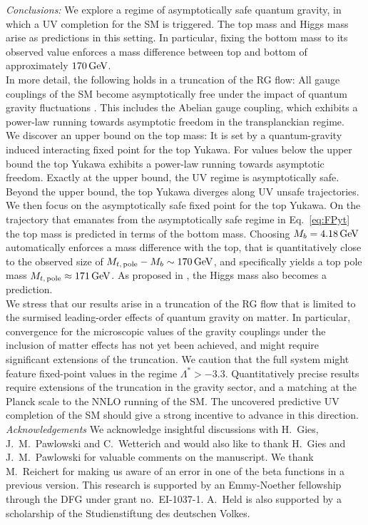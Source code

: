 \documentclass[%
 reprint,
 superscriptaddress,
preprintnumbers,
nofootinbib,
 amsmath,amssymb,
 aps,
prl,
]{revtex4-1}
\begin{document}
\noindent\emph {Conclusions:}
We explore a regime of asymptotically safe quantum gravity, in which a UV completion for the SM is triggered. The top mass and Higgs mass arise as predictions in this setting. In particular, fixing the bottom mass to its observed value enforces a mass difference between top and bottom of approximately $ 170\, \rm GeV$.
\\
In more detail, the following holds in a truncation of the RG flow:
All gauge couplings of the SM become asymptotically free under the impact of quantum gravity fluctuations \cite{Daum:2009dn,Folkerts:2011jz,Harst:2011zx,Christiansen:2017gtg}. This includes the Abelian gauge coupling, which 
exhibits a power-law running towards asymptotic freedom in the transplanckian regime.
\\
We discover an upper bound on the top mass: It is set by a quantum-gravity induced interacting fixed point for the top Yukawa. For values below the upper bound the top Yukawa exhibits a power-law running towards asymptotic freedom. Exactly at the upper bound, the UV regime is asymptotically safe. Beyond the upper bound, the top Yukawa diverges along UV unsafe trajectories.
\\
We then focus on the asymptotically safe fixed point for the top Yukawa. On the trajectory that emanates from the asymptotically safe regime in Eq.~\eqref{eq:FPyt} the top mass is predicted in terms of the bottom mass. Choosing $M_b=4.18\, \rm GeV$ automatically enforces a mass difference with the top, that is quantitatively close to the observed size of $M_{t,\, \rm pole}-M_b\sim 170\, \rm GeV$, and specifically yields a top pole mass $M_{t,\, \rm pole} \approx 171\, \rm GeV$. As proposed in \cite{Shaposhnikov:2009pv,Bezrukov:2012sa}, the Higgs mass also becomes a prediction.\\
We stress that our results arise in a truncation of the RG flow that is limited to  the surmised leading-order effects of quantum gravity on matter. 
In particular, convergence for the microscopic values of the gravity couplings under the inclusion of matter effects has not yet been achieved, and might require significant extensions of the truncation. We caution that the full system might feature fixed-point values in the regime $\Lambda^{\ast}>-3.3$.
Quantitatively precise results require extensions of the truncation in the gravity sector, and a matching at the Planck scale to the NNLO running of the SM. 
The uncovered predictive UV completion of the SM should give a strong incentive to advance in this direction.
\\
\noindent\emph{Acknowledgements}
We acknowledge insightful discussions with H.~Gies, J.~M.~Pawlowski and C.~Wetterich and would also like to thank H.~Gies and J.~M.~Pawlowski for valuable comments on the manuscript. We thank M.~Reichert for making us aware of an error in one of the beta functions in a previous version.
This research is supported by an Emmy-Noether fellowship through the DFG under grant no.~EI-1037-1.
A.~Held is also supported by a scholarship of the Studienstiftung des deutschen Volkes.
\end{document}
